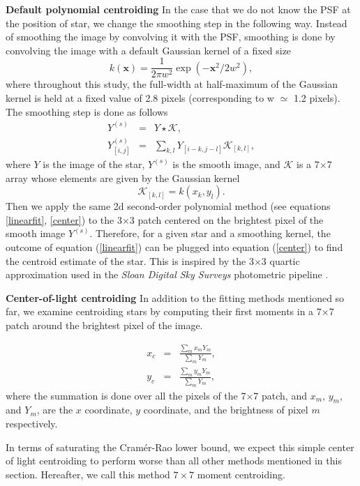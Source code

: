 \documentclass[12pt, preprint]{aastex}
\newcommand{\beq}{\begin{equation}}
\newcommand{\eeq}{\end{equation}}
\begin{document}
\begin{description}
\item{{\bf Default polynomial centroiding}} \quad In the case that 
we do not know the PSF at the position of star, we change 
the smoothing step in the following way. Instead of smoothing the image 
by convolving it with the PSF, smoothing is done by convolving the image 
with a default Gaussian kernel of a fixed size 
\beq
k(\mathbf{x}) = \frac{1}{2\pi w^2}\exp(-\mathbf{x}^{2}/2w^{2}),
\eeq
where throughout this study, the full-width at half-maximum of the Gaussian kernel is held at
a fixed value of 2.8 pixels (corresponding to w $\simeq$ 1.2 pixels). The smoothing step is done as follows
\begin{eqnarray}
Y^{(s)} &=& Y \star \mathcal{K}, \\
Y^{(s)}_{[i,j]} &=& \sum_{k,l}Y_{[i-k,j-l]}\mathcal{K}_{[k,l]},
\end{eqnarray}
where $Y$ is the image of the star, $Y^{(s)}$ is the smooth image, and $\mathcal{K}$ is a 7$\times$7 
array whose elements are given by the Gaussian kernel
\beq
\mathcal{K}_{[k,l]} = k(x_{k},y_{l}).
\eeq 
Then we apply the same 2d second-order polynomial method (see equations \ref{linearfit}, \ref{center}) to the 3$\times$3 patch centered on the brightest
pixel of the smooth image $Y^{(s)}$. Therefore, for a given star and a smoothing kernel,
the outcome of equation (\ref{linearfit}) can be
plugged into equation (\ref{center}) to find the centroid estimate
of the star. This is inspired by the 3$\times$3 quartic approximation 
used in the \textsl{Sloan Digital Sky Surveys} photometric pipeline \citep{sdss}.

\item{{\bf Center-of-light centroiding}} \quad In addition to the fitting methods 
mentioned so far, we examine centroiding stars by computing their first moments
in a 7$\times$7 patch around the brightest pixel of the image.

\begin{eqnarray}
x_{c} &=& \frac{\sum_{m}x_{m}Y_{m}}{\sum_{m}Y_{m}}, \\
y_{c} &=& \frac{\sum_{m}y_{m}Y_{m}}{\sum_{m}Y_{m}},
\end{eqnarray}
where the summation is done over all the pixels of the 7$\times$7 patch, and $x_{m}$, 
$y_{m}$, and $Y_{m}$, are the $x$ coordinate, $y$ coordinate, and the brightness
of pixel $m$ respectively.

In terms of saturating the Cram\'{e}r-Rao lower bound, we expect this simple 
center of light centroiding to perform worse than all other methods mentioned in 
this section. Hereafter, we call this method $7\times7$ moment centroiding.

\end{description}
\end{document}
